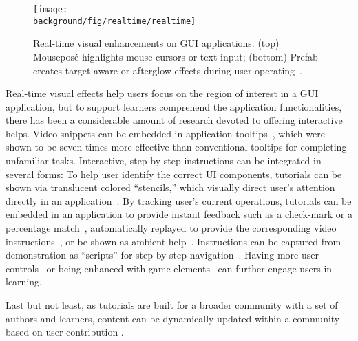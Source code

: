 \begin{figure*}[t!]
  \centering
  \texttt{[image: \\background/fig/realtime/realtime]}
  \caption{Real-time visual enhancements on GUI applications: (top) Mouseposé highlights mouse cursors or text input; (bottom) Prefab creates target-aware or afterglow effects during user operating~\cite{Dixon:2010fb}.}
  \label{fig:related_realtime}
\end{figure*}

Real-time visual effects help users focus on the region of interest in a GUI application, but to support learners comprehend the application functionalities, there has been a considerable amount of research devoted to offering interactive helps.
%
Video snippets can be embedded in application tooltips~\cite{Grossman:2010wr}, which were shown to be seven times more effective than conventional tooltips for completing unfamiliar tasks.
%
Interactive, step-by-step instructions can be integrated in several forms:
%
To help user identify the correct UI components, tutorials can be shown via translucent colored ``stencils,'' which visually direct user's attention directly in an application~\cite{Kelleher:2005:STD:1054972.1055047}.
%
By tracking user's current operations, tutorials can be embedded in an application to provide instant feedback such as a check-mark or a percentage match~\cite{Fernquist:2011:SRE:2047196.2047245}, automatically replayed to provide the corresponding video instructions~\cite{Pongnumkul:2011ju}, or be shown as ambient help~\cite{Matejka:2011:AH:1978942.1979349}.
%
Instructions can be captured from demonstration as ``scripts'' for step-by-step navigation~\cite{Bergman:2005:DocWizards}. Having more user controls~\cite{Lieberman:2014:SML:2557500.2557543} or being enhanced with game elements~\cite{Li:2014:CGM:2556288.2556954, Dontcheva:2014:CCL:2556288.2557217} can further engage users in learning.

Last but not least, as tutorials are built for a broader community with a set of authors and learners, content can be dynamically updated within a community based on user contribution \cite{Lafreniere:2013ff,Matejka:2009:CCR:1622176.1622214, Bunt:2014:TPI:2556288.2557118}.


